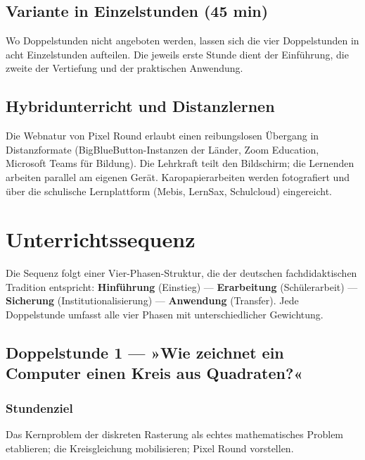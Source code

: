 \documentclass[12pt,a4paper]{scrartcl}
\newcommand{\acc}[1]{\textcolor{accent}{\textbf{#1}}}
\begin{document}
\subsection{Variante in Einzelstunden (45 min)}
Wo Doppelstunden nicht angeboten werden, lassen sich die vier Doppelstunden in acht Einzelstunden aufteilen. Die jeweils erste Stunde dient der Einführung, die zweite der Vertiefung und der praktischen Anwendung.

\subsection{Hybridunterricht und Distanzlernen}
Die Webnatur von Pixel Round erlaubt einen reibungslosen Übergang in Distanzformate (BigBlueButton-Instanzen der Länder, Zoom Education, Microsoft Teams für Bildung). Die Lehrkraft teilt den Bildschirm; die Lernenden arbeiten parallel am eigenen Gerät. Karopapierarbeiten werden fotografiert und über die schulische Lernplattform (Mebis, LernSax, Schulcloud) eingereicht.

\section{Unterrichtssequenz}

Die Sequenz folgt einer Vier-Phasen-Struktur, die der deutschen fachdidaktischen Tradition entspricht: \acc{Hinführung} (Einstieg) --- \acc{Erarbeitung} (Schülerarbeit) --- \acc{Sicherung} (Institutionalisierung) --- \acc{Anwendung} (Transfer). Jede Doppelstunde umfasst alle vier Phasen mit unterschiedlicher Gewichtung.

\subsection{Doppelstunde 1 --- »Wie zeichnet ein Computer einen Kreis aus Quadraten?«}\label{stunde1}

\subsubsection*{Stundenziel}
Das Kernproblem der diskreten Rasterung als echtes mathematisches Problem etablieren; die Kreisgleichung mobilisieren; Pixel Round vorstellen.

\medskip
\end{document}
